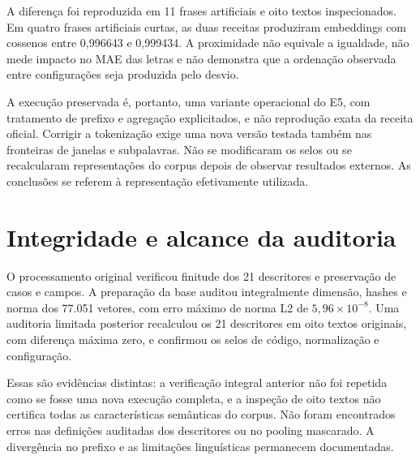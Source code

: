 A diferença foi reproduzida em 11 frases artificiais e oito textos inspecionados. Em quatro frases artificiais curtas, as duas receitas produziram embeddings com cossenos entre 0,996643 e 0,999434. A proximidade não equivale a igualdade, não mede impacto no MAE das letras e não demonstra que a ordenação observada entre configurações seja produzida pelo desvio.

A execução preservada é, portanto, uma variante operacional do E5, com tratamento de prefixo e agregação explicitados, e não reprodução exata da receita oficial. Corrigir a tokenização exige uma nova versão testada também nas fronteiras de janelas e subpalavras. Não se modificaram os selos ou se recalcularam representações do corpus depois de observar resultados externos. As conclusões se referem à representação efetivamente utilizada.

\section{Integridade e alcance da auditoria}
O processamento original verificou finitude dos 21 descritores e preservação de casos e campos. A preparação da base auditou integralmente dimensão, hashes e norma dos 77.051 vetores, com erro máximo de norma L2 de $5{,}96\times10^{-8}$. Uma auditoria limitada posterior recalculou os 21 descritores em oito textos originais, com diferença máxima zero, e confirmou os selos de código, normalização e configuração.

Essas são evidências distintas: a verificação integral anterior não foi repetida como se fosse uma nova execução completa, e a inspeção de oito textos não certifica todas as características semânticas do corpus. Não foram encontrados erros nas definições auditadas dos descritores ou no pooling mascarado. A divergência no prefixo e as limitações linguísticas permanecem documentadas.
